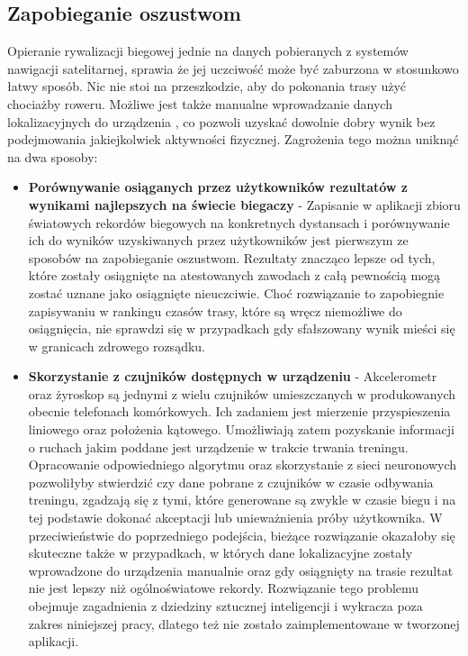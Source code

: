 \subsection{Zapobieganie oszustwom}
Opieranie rywalizacji biegowej jednie na danych pobieranych z systemów nawigacji satelitarnej, sprawia że jej uczciwość może być zaburzona w stosunkowo łatwy sposób. Nic nie stoi na przeszkodzie, aby do pokonania trasy użyć chociażby roweru. Możliwe jest także manualne wprowadzanie danych lokalizacyjnych do urządzenia \cite{fakegps}, co pozwoli uzyskać dowolnie dobry wynik bez podejmowania jakiejkolwiek aktywności fizycznej. Zagrożenia tego można uniknąć na dwa sposoby:
\begin{itemize}
\item{\textbf{Porównywanie osiąganych przez użytkowników rezultatów z wynikami najlepszych na świecie biegaczy}} - Zapisanie w aplikacji zbioru światowych rekordów biegowych na konkretnych dystansach i porównywanie ich do wyników uzyskiwanych przez użytkowników jest pierwszym ze sposobów na zapobieganie oszustwom. Rezultaty znacząco lepsze od tych, które zostały osiągnięte na atestowanych zawodach z całą pewnością mogą zostać uznane jako osiągnięte nieuczciwie. Choć rozwiązanie to zapobiegnie zapisywaniu w rankingu czasów trasy, które są wręcz niemożliwe do osiągnięcia, nie sprawdzi się w przypadkach gdy sfałszowany wynik mieści się w granicach zdrowego rozsądku.
\item{\textbf{Skorzystanie z czujników dostępnych w urządzeniu}} - Akcelerometr oraz żyroskop są jednymi z wielu czujników umieszczanych w produkowanych obecnie telefonach komórkowych. Ich zadaniem jest mierzenie przyspieszenia liniowego oraz położenia kątowego. Umożliwiają zatem pozyskanie informacji o ruchach jakim poddane jest urządzenie w trakcie trwania treningu. Opracowanie odpowiedniego algorytmu oraz skorzystanie z sieci neuronowych pozwoliłyby stwierdzić czy dane pobrane z czujników w czasie odbywania treningu, zgadzają się z tymi, które generowane są zwykle w czasie biegu i na tej podstawie dokonać akceptacji lub unieważnienia próby użytkownika. W przeciwieństwie do poprzedniego podejścia, bieżące rozwiązanie okazałoby się skuteczne także w przypadkach, w których dane lokalizacyjne zostały wprowadzone do urządzenia manualnie oraz gdy osiągnięty na trasie rezultat nie jest lepszy niż ogólnoświatowe rekordy. Rozwiązanie tego problemu obejmuje zagadnienia z dziedziny sztucznej inteligencji i wykracza poza zakres niniejszej pracy, dlatego też nie zostało zaimplementowane w tworzonej aplikacji.
\end{itemize}

